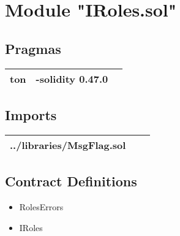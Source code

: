 
\section{Module "IRoles.sol"}


\subsection{Pragmas}


\noindent\begin{tabular}{|l|l|p{5cm}|}\hline
ton & -solidity 0.47.0 &\\\hline
\end{tabular}


\subsection{Imports}


\noindent\begin{tabular}{|l|l|p{5cm}|}\hline
../libraries/MsgFlag.sol &\\\hline
\end{tabular}


\subsection{Contract Definitions}

\begin{itemize}
\item RolesErrors
\item IRoles
\end{itemize}
